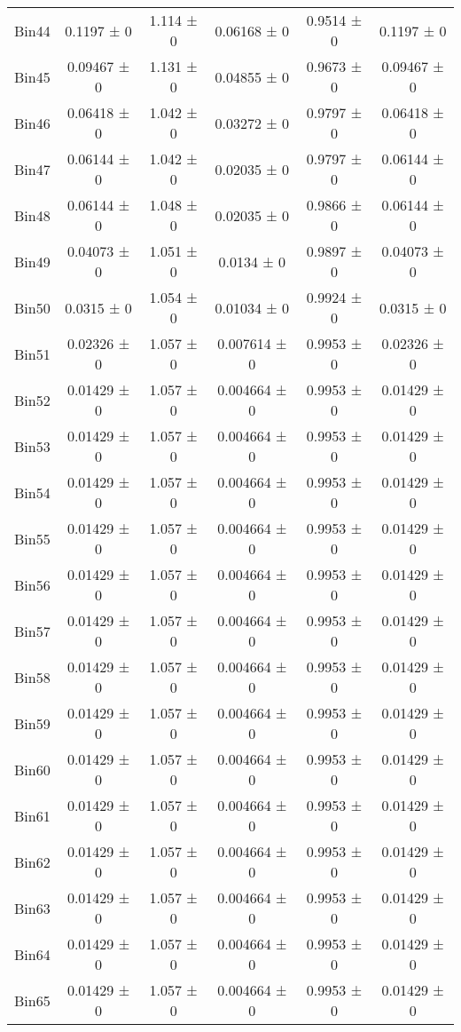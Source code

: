 \begin{tabular}{@{\extracolsep{4pt}}lccccc@{}}
     Bin44 & 0.1197 ± 0 & 1.114 ± 0 & 0.06168 ± 0 & 0.9514 ± 0 & 0.1197 ± 0 \\ 
     Bin45 & 0.09467 ± 0 & 1.131 ± 0 & 0.04855 ± 0 & 0.9673 ± 0 & 0.09467 ± 0 \\ 
     Bin46 & 0.06418 ± 0 & 1.042 ± 0 & 0.03272 ± 0 & 0.9797 ± 0 & 0.06418 ± 0 \\ 
     Bin47 & 0.06144 ± 0 & 1.042 ± 0 & 0.02035 ± 0 & 0.9797 ± 0 & 0.06144 ± 0 \\ 
     Bin48 & 0.06144 ± 0 & 1.048 ± 0 & 0.02035 ± 0 & 0.9866 ± 0 & 0.06144 ± 0 \\ 
     Bin49 & 0.04073 ± 0 & 1.051 ± 0 & 0.0134 ± 0 & 0.9897 ± 0 & 0.04073 ± 0 \\ 
     Bin50 & 0.0315 ± 0 & 1.054 ± 0 & 0.01034 ± 0 & 0.9924 ± 0 & 0.0315 ± 0 \\ 
     Bin51 & 0.02326 ± 0 & 1.057 ± 0 & 0.007614 ± 0 & 0.9953 ± 0 & 0.02326 ± 0 \\ 
     Bin52 & 0.01429 ± 0 & 1.057 ± 0 & 0.004664 ± 0 & 0.9953 ± 0 & 0.01429 ± 0 \\ 
     Bin53 & 0.01429 ± 0 & 1.057 ± 0 & 0.004664 ± 0 & 0.9953 ± 0 & 0.01429 ± 0 \\ 
     Bin54 & 0.01429 ± 0 & 1.057 ± 0 & 0.004664 ± 0 & 0.9953 ± 0 & 0.01429 ± 0 \\ 
     Bin55 & 0.01429 ± 0 & 1.057 ± 0 & 0.004664 ± 0 & 0.9953 ± 0 & 0.01429 ± 0 \\ 
     Bin56 & 0.01429 ± 0 & 1.057 ± 0 & 0.004664 ± 0 & 0.9953 ± 0 & 0.01429 ± 0 \\ 
     Bin57 & 0.01429 ± 0 & 1.057 ± 0 & 0.004664 ± 0 & 0.9953 ± 0 & 0.01429 ± 0 \\ 
     Bin58 & 0.01429 ± 0 & 1.057 ± 0 & 0.004664 ± 0 & 0.9953 ± 0 & 0.01429 ± 0 \\ 
     Bin59 & 0.01429 ± 0 & 1.057 ± 0 & 0.004664 ± 0 & 0.9953 ± 0 & 0.01429 ± 0 \\ 
     Bin60 & 0.01429 ± 0 & 1.057 ± 0 & 0.004664 ± 0 & 0.9953 ± 0 & 0.01429 ± 0 \\ 
     Bin61 & 0.01429 ± 0 & 1.057 ± 0 & 0.004664 ± 0 & 0.9953 ± 0 & 0.01429 ± 0 \\ 
     Bin62 & 0.01429 ± 0 & 1.057 ± 0 & 0.004664 ± 0 & 0.9953 ± 0 & 0.01429 ± 0 \\ 
     Bin63 & 0.01429 ± 0 & 1.057 ± 0 & 0.004664 ± 0 & 0.9953 ± 0 & 0.01429 ± 0 \\ 
     Bin64 & 0.01429 ± 0 & 1.057 ± 0 & 0.004664 ± 0 & 0.9953 ± 0 & 0.01429 ± 0 \\ 
     Bin65 & 0.01429 ± 0 & 1.057 ± 0 & 0.004664 ± 0 & 0.9953 ± 0 & 0.01429 ± 0 \\ 

\end{tabular}

